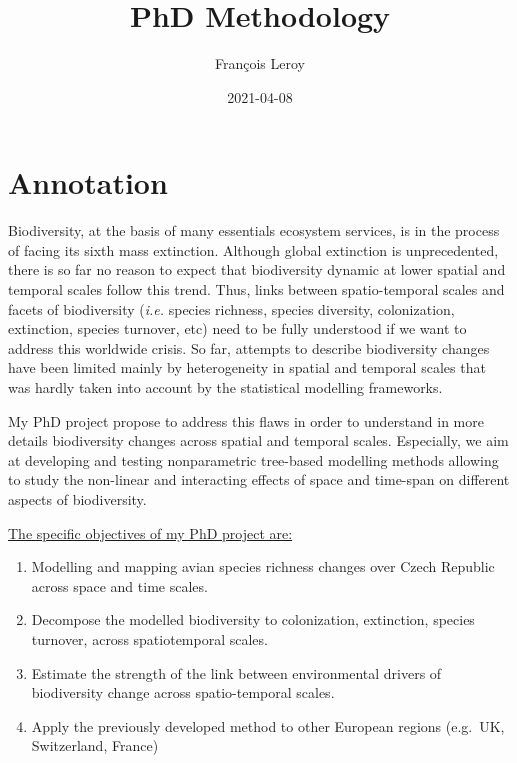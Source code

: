 \documentclass[
  12pt,
  oneside]{report}
\title{PhD Methodology}
\author{François Leroy}
\date{2021-04-08}
\providecommand{\tightlist}{%
  \setlength{\itemsep}{0pt}\setlength{\parskip}{0pt}}
\begin{document}
\maketitle


\cleardoublepage 
{}

{
\hypersetup{linkcolor=}
\setcounter{tocdepth}{1}
\tableofcontents
\newpage
}
\vspace{50mm}


\cleardoublepage 
{}


\hypertarget{annotation}{%
\chapter*{Annotation}\label{annotation}}

Biodiversity, at the basis of many essentials ecosystem services, is in the process of facing its sixth mass extinction. Although global extinction is unprecedented, there is so far no reason to expect that biodiversity dynamic at lower spatial and temporal scales follow this trend. Thus, links between
spatio-temporal scales and facets of biodiversity (\emph{i.e.} species richness, species diversity, colonization, extinction,
species turnover, etc) need to be fully understood if we want to address this worldwide crisis. So far,
attempts to describe biodiversity changes have been limited mainly by heterogeneity in spatial and
temporal scales that was hardly taken into account by the statistical modelling frameworks.

My PhD project propose to address this flaws in order to understand in more details biodiversity
changes across spatial and temporal scales. Especially, we aim at developing and testing nonparametric
tree-based modelling methods allowing to study the non-linear and interacting effects of
space and time-span on different aspects of biodiversity.

\underline{The specific objectives of my PhD project are:}

\begin{enumerate}
\def\labelenumi{\arabic{enumi}.}
\tightlist
\item
  Modelling and mapping avian species richness changes over Czech Republic across space and time
  scales.
\item
  Decompose the modelled biodiversity to colonization, extinction, species turnover, across spatiotemporal
  scales.
\item
  Estimate the strength of the link between environmental drivers of biodiversity change across
  spatio-temporal scales.
\item
  Apply the previously developed method to other European regions (e.g.~UK, Switzerland, France)
\end{enumerate}
\end{document}
